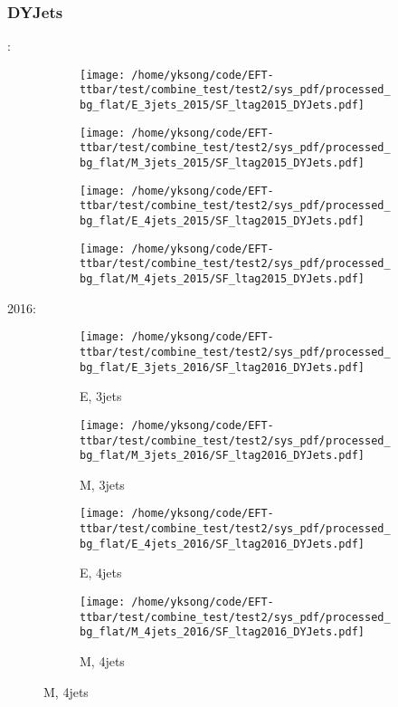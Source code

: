 \documentclass{beamer}
\begin{document}
\begin{frame}
\frametitle{DYJets}
\fontsize{5}{1}:
\begin{figure}
\centering
\begin{subfigure}[b]{0.24\textwidth}
\texttt{[image: /home/yksong/code/EFT-ttbar/test/combine\_test/test2/sys\_pdf/processed\_bg\_flat/E\_3jets\_2015/SF\_ltag2015\_DYJets.pdf]}
\end{subfigure}
\begin{subfigure}[b]{0.24\textwidth}
\texttt{[image: /home/yksong/code/EFT-ttbar/test/combine\_test/test2/sys\_pdf/processed\_bg\_flat/M\_3jets\_2015/SF\_ltag2015\_DYJets.pdf]}
\end{subfigure}
\begin{subfigure}[b]{0.24\textwidth}
\texttt{[image: /home/yksong/code/EFT-ttbar/test/combine\_test/test2/sys\_pdf/processed\_bg\_flat/E\_4jets\_2015/SF\_ltag2015\_DYJets.pdf]}
\end{subfigure}
\begin{subfigure}[b]{0.24\textwidth}
\texttt{[image: /home/yksong/code/EFT-ttbar/test/combine\_test/test2/sys\_pdf/processed\_bg\_flat/M\_4jets\_2015/SF\_ltag2015\_DYJets.pdf]}
\end{subfigure}
\end{figure}
2016:
\begin{figure}
\centering
\begin{subfigure}[b]{0.24\textwidth}
\texttt{[image: /home/yksong/code/EFT-ttbar/test/combine\_test/test2/sys\_pdf/processed\_bg\_flat/E\_3jets\_2016/SF\_ltag2016\_DYJets.pdf]}
\captionsetup{font=tiny}
\caption{E, 3jets}
\end{subfigure}
\begin{subfigure}[b]{0.24\textwidth}
\texttt{[image: /home/yksong/code/EFT-ttbar/test/combine\_test/test2/sys\_pdf/processed\_bg\_flat/M\_3jets\_2016/SF\_ltag2016\_DYJets.pdf]}
\captionsetup{font=tiny}
\caption{M, 3jets}
\end{subfigure}
\begin{subfigure}[b]{0.24\textwidth}
\texttt{[image: /home/yksong/code/EFT-ttbar/test/combine\_test/test2/sys\_pdf/processed\_bg\_flat/E\_4jets\_2016/SF\_ltag2016\_DYJets.pdf]}
\captionsetup{font=tiny}
\caption{E, 4jets}
\end{subfigure}
\begin{subfigure}[b]{0.24\textwidth}
\texttt{[image: /home/yksong/code/EFT-ttbar/test/combine\_test/test2/sys\_pdf/processed\_bg\_flat/M\_4jets\_2016/SF\_ltag2016\_DYJets.pdf]}
\captionsetup{font=tiny}
\caption{M, 4jets}
\end{subfigure}
\end{figure}
\end{frame}
\end{document}
